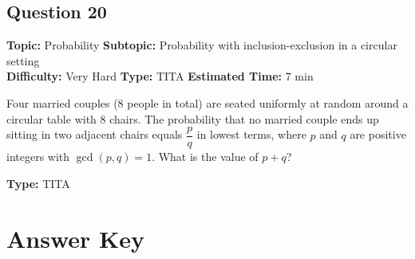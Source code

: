 \documentclass[11pt,a4paper]{article}
\begin{document}
\subsection*{Question 20}
\textbf{Topic:} Probability \quad
\textbf{Subtopic:} Probability with inclusion-exclusion in a circular setting \\
\textbf{Difficulty:} Very Hard \quad
\textbf{Type:} TITA \quad
\textbf{Estimated Time:} 7 min
\begin{tcolorbox}[qbox]
Four married couples (8 people in total) are seated uniformly at random around a circular table with 8 chairs. The probability that no married couple ends up sitting in two adjacent chairs equals \(\dfrac{p}{q}\) in lowest terms, where \(p\) and \(q\) are positive integers with \(\gcd(p,q)=1\). What is the value of \(p + q\)?
\end{tcolorbox}
\textbf{Type:} TITA

\newpage

\section*{Answer Key}
\end{document}
